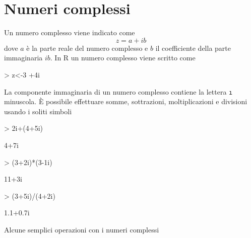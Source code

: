 \documentclass[onecolumn,11pt]{book}
\begin{document}
\section{Numeri complessi}
Un numero complesso viene indicato come $$z=a +ib$$ dove $a$  \`e la parte reale del numero complesso e $b$ il coefficiente della parte immaginaria $ib$.
In \textsf{R} un numero complesso viene scritto come
\begin{Schunk}
\begin{Sinput}
> z<-3 +4i
\end{Sinput}
\end{Schunk}
La componente immaginaria di un numero complesso contiene la lettera \texttt{\i} minuscola.  \`E possibile effettuare somme, sottrazioni, moltiplicazioni e divisioni usando i soliti simboli
\begin{Schunk}
\begin{Sinput}
> 2i+(4+5i)
\end{Sinput}
\begin{Soutput}
[1] 4+7i
\end{Soutput}
\begin{Sinput}
> (3+2i)*(3-1i)
\end{Sinput}
\begin{Soutput}
[1] 11+3i
\end{Soutput}
\begin{Sinput}
> (3+5i)/(4+2i)
\end{Sinput}
\begin{Soutput}
[1] 1.1+0.7i
\end{Soutput}
\end{Schunk}
 Alcune semplici operazioni con i numeri complessi
\end{document}
